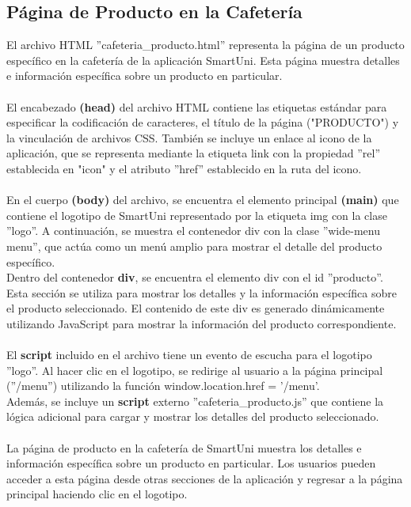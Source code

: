 \documentclass[12pt]{report}
\begin{document}
\subsection{Página de Producto en la Cafetería}
El archivo HTML ''cafeteria\_producto.html'' representa la página de un producto específico en la cafetería de la aplicación SmartUni. Esta página muestra detalles e información específica sobre un producto en particular.\\\\
El encabezado\textbf{ (head) }del archivo HTML contiene las etiquetas estándar para especificar la codificación de caracteres, el título de la página ("PRODUCTO") y la vinculación de archivos CSS. También se incluye un enlace al icono de la aplicación, que se representa mediante la etiqueta link con la propiedad ''rel'' establecida en "icon" y el atributo ''href'' establecido en la ruta del icono.
\\\\En el cuerpo\textbf{ (body) }del archivo, se encuentra el elemento principal \textbf{(main)} que contiene el logotipo de SmartUni representado por la etiqueta img con la clase ''logo''. A continuación, se muestra el contenedor div con la clase ''wide-menu menu'', que actúa como un menú amplio para mostrar el detalle del producto específico.
\\Dentro del contenedor \textbf{div}, se encuentra el elemento div con el id ''producto''. Esta sección se utiliza para mostrar los detalles y la información específica sobre el producto seleccionado. El contenido de este div es generado dinámicamente utilizando JavaScript para mostrar la información del producto correspondiente.
\\\\El \textbf{script}  incluido en el archivo tiene un evento de escucha para el logotipo ''logo''. Al hacer clic en el logotipo, se redirige al usuario a la página principal (''/menu'') utilizando la función window.location.href = '/menu'.
\\Además, se incluye un \textbf{script} externo ''cafeteria\_producto.js'' que contiene la lógica adicional para cargar y mostrar los detalles del producto seleccionado.
\\\\
La página de producto en la cafetería de SmartUni muestra los detalles e información específica sobre un producto en particular. Los usuarios pueden acceder a esta página desde otras secciones de la aplicación y regresar a la página principal haciendo clic en el logotipo.
\end{document}
